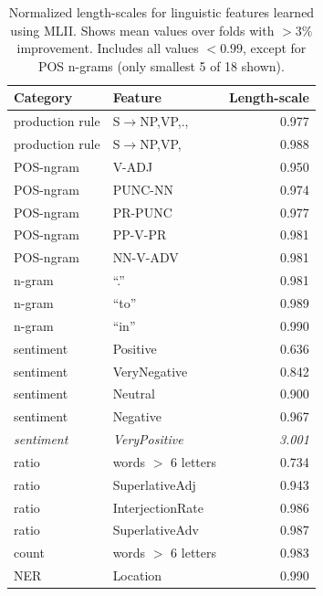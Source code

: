 \begin{table}[t]
\small
  \begin{tabularx}{\columnwidth}{l | X | r }
  Category & Feature & Length-scale\\
  \hline
  production rule & S$\to$NP,VP,.,	& 0.977\nonumber\\  
  production rule & S$\to$NP,VP,	& 0.988\nonumber\\  
  \hline
  POS-ngram & V-ADJ	& 0.950	\nonumber\\
  POS-ngram & PUNC-NN	& 0.974 \nonumber\\  
  POS-ngram & PR-PUNC	& 0.977	\nonumber\\
  POS-ngram & PP-V-PR	& 0.981\nonumber\\
  POS-ngram & NN-V-ADV	& 0.981\nonumber\\    
  \hline
  n-gram & ``.''	& 0.981\nonumber\\
  n-gram & ``to'' 	& 0.989\nonumber\\
  n-gram & ``in''	& 0.990\nonumber\\  
  \hline
  sentiment & Positive	& 0.636 \nonumber\\
  sentiment & VeryNegative	 & 0.842 \nonumber\\
  sentiment & Neutral	& 0.900 \nonumber\\
  sentiment & Negative & 0.967 \nonumber\\    
\emph{sentiment} & \emph{VeryPositive} & \emph{3.001} \nonumber \\%
\hline
  ratio & words $>$ 6 letters & 0.734 \nonumber\\
  ratio & SuperlativeAdj	& 0.943 \nonumber\\
  ratio & InterjectionRate	& 0.986 \nonumber\\
  ratio &	SuperlativeAdv	& 0.987 \nonumber\\
 \hline
  count & words $>$ 6 letters	& 0.983 \nonumber\\  
 \hline
  NER & Location & 0.990 \nonumber  
  \end{tabularx}
  \caption{Normalized length-scales for linguistic features learned using MLII. Shows mean values over folds with $>3\%$ improvement. Includes all values $<0.99$, except for POS n-grams (only smallest 5 of 18 shown).  }
  \label{tab:extreme_features}
\end{table}

